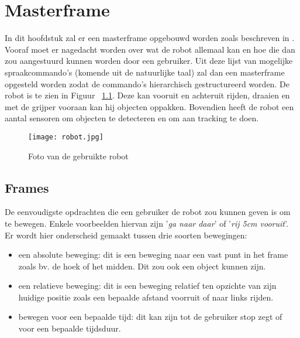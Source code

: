 
\chapter{Masterframe}
\label{cha:masterframe}

In dit hoofdstuk zal er een masterframe opgebouwd worden zoals beschreven in \cite{Tessema}. Vooraf moet er nagedacht worden over wat de robot allemaal kan en hoe die dan zou aangestuurd kunnen worden door een gebruiker. Uit deze lijst van mogelijke spraakcommando's (komende uit de natuurlijke taal) zal dan een masterframe opgesteld worden zodat de commando's hierarchisch gestructureerd worden. De robot is te zien in Figuur ~\ref{fig:robot}. Deze kan vooruit en achteruit rijden, draaien en met de grijper vooraan kan hij objecten oppakken. Bovendien heeft de robot een aantal sensoren om objecten te detecteren en om aan tracking te doen. \\

\begin{figure}[h]
\texttt{[image: robot.jpg]}
\label{fig:robot}
\centering
\caption{Foto van de gebruikte robot}
\end{figure}

\section{Frames}
\label{sec:frames}

De eenvoudigste opdrachten die een gebruiker de robot zou kunnen geven is om te bewegen. Enkele voorbeelden hiervan zijn '\textit{ga naar daar}' of '\textit{rij 5cm vooruit}'. Er wordt hier onderscheid gemaakt tussen drie soorten bewegingen:

\begin{itemize}
\item een absolute beweging: dit is een beweging naar een vast punt in het frame zoals bv. de hoek of het midden. Dit zou ook een object kunnen zijn.
\item een relatieve beweging: dit is een beweging relatief ten opzichte van zijn huidige positie zoals een bepaalde afstand voorruit of naar links rijden. 
\item bewegen voor een bepaalde tijd: dit kan zijn tot de gebruiker stop zegt of voor een bepaalde tijdsduur.
\end{itemize}

